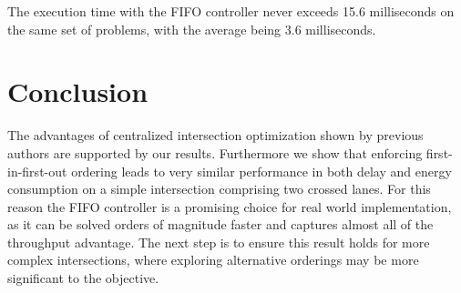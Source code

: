 The execution time with the FIFO controller never exceeds 15.6 milliseconds on the same set of problems, with the average being 3.6 milliseconds. 

\section{Conclusion}
The advantages of centralized intersection optimization shown by previous authors are supported by our results.  Furthermore we show that enforcing first-in-first-out ordering leads to very similar performance in both delay and energy consumption on a simple intersection comprising two crossed lanes. For this reason the FIFO controller is a promising choice for real world implementation, as it can be solved orders of magnitude faster and captures almost all of the throughput advantage. The next step is to ensure this result holds for more complex intersections, where exploring alternative orderings may be more significant to the objective.    